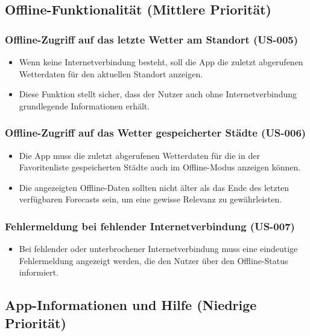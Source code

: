 \documentclass{article}
\begin{document}
\subsection{Offline-Funktionalität (Mittlere Priorität)}

\subsubsection{Offline-Zugriff auf das letzte Wetter am Standort (US-005)}
\begin{itemize}
    \item Wenn keine Internetverbindung besteht, soll die App die zuletzt abgerufenen Wetterdaten für den aktuellen Standort anzeigen.
    \item Diese Funktion stellt sicher, dass der Nutzer auch ohne Internetverbindung grundlegende Informationen erhält.
\end{itemize}

\subsubsection{Offline-Zugriff auf das Wetter gespeicherter Städte (US-006)}
\begin{itemize}
    \item Die App muss die zuletzt abgerufenen Wetterdaten für die in der Favoritenliste gespeicherten Städte auch im Offline-Modus anzeigen können.
    \item Die angezeigten Offline-Daten sollten nicht älter als das Ende des letzten verfügbaren Forecasts sein, um eine gewisse Relevanz zu gewährleisten.
\end{itemize}

\subsubsection{Fehlermeldung bei fehlender Internetverbindung (US-007)}
\begin{itemize}
    \item Bei fehlender oder unterbrochener Internetverbindung muss eine eindeutige Fehlermeldung angezeigt werden, die den Nutzer über den Offline-Status informiert.
\end{itemize}

\subsection{App-Informationen und Hilfe (Niedrige Priorität)}
\end{document}
